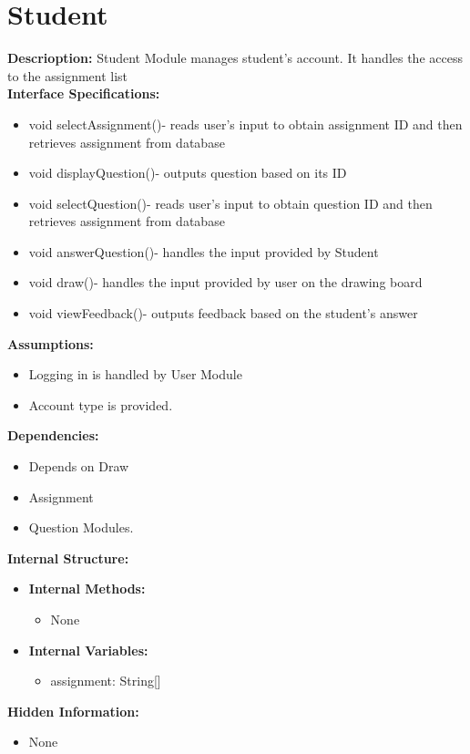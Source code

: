 \chapter{Student}
\textbf{Descrioption:} Student Module manages student's account. It handles the access to the assignment list\\
\textbf{Interface Specifications:}
\begin{itemize}
   \item void selectAssignment()- reads user's input to obtain assignment ID and then retrieves assignment from database
    \item void displayQuestion()- outputs question based on its ID
    \item void selectQuestion()- reads user's input to obtain question ID and then retrieves assignment from database
    \item void answerQuestion()- handles the input provided by Student
    \item void draw()- handles the input provided by user on the drawing board
    \item void viewFeedback()- outputs feedback based on the student's answer
\end{itemize}
\textbf{Assumptions:}
\begin{itemize}
    \item Logging in is handled by User Module
    \item Account type is provided.
\end{itemize}
\textbf{Dependencies:}
\begin{itemize}
    \item Depends on Draw
    \item Assignment
    \item Question Modules.
\end{itemize}
\textbf{Internal Structure:}
\begin{itemize}         
   \item \textbf{Internal Methods:}
           \begin{itemize}
           \item None
           \end{itemize}  
          \item  \textbf{Internal Variables:}
                  \begin{itemize}
            \item assignment: String[]
        \end{itemize}
        \end{itemize}
     \textbf{Hidden Information:}
    \begin{itemize}
    \item None
    \end{itemize}



